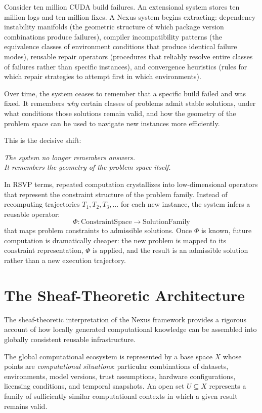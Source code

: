 Consider ten million CUDA build failures. An extensional
system stores ten million logs and ten million fixes.
A Nexus system begins extracting: dependency instability
manifolds (the geometric structure of which package version
combinations produce failures), compiler incompatibility
patterns (the equivalence classes of environment conditions
that produce identical failure modes), reusable repair
operators (procedures that reliably resolve entire classes
of failures rather than specific instances), and
convergence heuristics (rules for which repair strategies
to attempt first in which environments).

Over time, the system ceases to remember that a specific
build failed and was fixed. It remembers \emph{why} certain
classes of problems admit stable solutions, under what
conditions those solutions remain valid, and how the
geometry of the problem space can be used to navigate
new instances more efficiently.

This is the decisive shift:

\begin{center}
\textit{The system no longer remembers answers.\\
It remembers the geometry of the problem space itself.}
\end{center}

In RSVP terms, repeated computation crystallizes into
low-dimensional operators that represent the constraint
structure of the problem family. Instead of recomputing
trajectories $T_1, T_2, T_3, \ldots$ for each new instance,
the system infers a reusable operator:
\[
  \Phi : \text{ConstraintSpace} \to \text{SolutionFamily}
\]
that maps problem constraints to admissible solutions.
Once $\Phi$ is known, future computation is dramatically
cheaper: the new problem is mapped to its constraint
representation, $\Phi$ is applied, and the result is
an admissible solution rather than a new execution
trajectory.

\section{The Sheaf-Theoretic Architecture}
\label{sec:sheaf-architecture}

The sheaf-theoretic interpretation of the Nexus framework
provides a rigorous account of how locally generated
computational knowledge can be assembled into globally
consistent reusable infrastructure.

The global computational ecosystem is represented by
a base space $X$ whose points are \emph{computational
situations}: particular combinations of datasets,
environments, model versions, trust assumptions,
hardware configurations, licensing conditions, and
temporal snapshots. An open set $U \subseteq X$
represents a family of sufficiently similar computational
contexts in which a given result remains valid.

